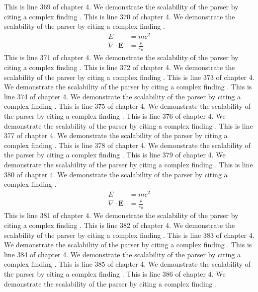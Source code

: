 This is line 369 of chapter 4. We demonstrate the scalability of the parser by citing a complex finding \cite{ref4_369}.
This is line 370 of chapter 4. We demonstrate the scalability of the parser by citing a complex finding \cite{ref4_370}.
\begin{align*}
  E &= mc^2 \\
  \nabla \cdot \mathbf{E} &= \frac{\rho}{\varepsilon_0}
\end{align*}
This is line 371 of chapter 4. We demonstrate the scalability of the parser by citing a complex finding \cite{ref4_371}.
This is line 372 of chapter 4. We demonstrate the scalability of the parser by citing a complex finding \cite{ref4_372}.
This is line 373 of chapter 4. We demonstrate the scalability of the parser by citing a complex finding \cite{ref4_373}.
This is line 374 of chapter 4. We demonstrate the scalability of the parser by citing a complex finding \cite{ref4_374}.
This is line 375 of chapter 4. We demonstrate the scalability of the parser by citing a complex finding \cite{ref4_375}.
This is line 376 of chapter 4. We demonstrate the scalability of the parser by citing a complex finding \cite{ref4_376}.
This is line 377 of chapter 4. We demonstrate the scalability of the parser by citing a complex finding \cite{ref4_377}.
This is line 378 of chapter 4. We demonstrate the scalability of the parser by citing a complex finding \cite{ref4_378}.
This is line 379 of chapter 4. We demonstrate the scalability of the parser by citing a complex finding \cite{ref4_379}.
This is line 380 of chapter 4. We demonstrate the scalability of the parser by citing a complex finding \cite{ref4_380}.
\begin{align*}
  E &= mc^2 \\
  \nabla \cdot \mathbf{E} &= \frac{\rho}{\varepsilon_0}
\end{align*}
This is line 381 of chapter 4. We demonstrate the scalability of the parser by citing a complex finding \cite{ref4_381}.
This is line 382 of chapter 4. We demonstrate the scalability of the parser by citing a complex finding \cite{ref4_382}.
This is line 383 of chapter 4. We demonstrate the scalability of the parser by citing a complex finding \cite{ref4_383}.
This is line 384 of chapter 4. We demonstrate the scalability of the parser by citing a complex finding \cite{ref4_384}.
This is line 385 of chapter 4. We demonstrate the scalability of the parser by citing a complex finding \cite{ref4_385}.
This is line 386 of chapter 4. We demonstrate the scalability of the parser by citing a complex finding \cite{ref4_386}.
